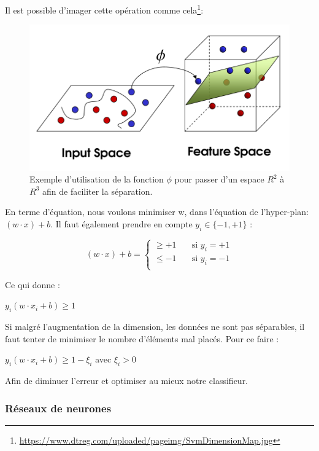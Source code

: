 \documentclass[a4paper, 11pt]{article}
\begin{document}
Il est possible d'imager cette opération comme cela\footnote{\url{https://www.dtreg.com/uploaded/pageimg/SvmDimensionMap.jpg}}:
\begin{figure}[H]
\centering
\includegraphics[scale=0.3]{images/svm_exemple_phi}
\caption{Exemple d'utilisation de la fonction $\phi$ pour passer d'un espace $R^2$ à $R^3$ afin de faciliter la séparation.}
\end{figure}


En terme d'équation, nous voulons minimiser w, dans l'équation de l'hyper-plan: $(w \cdot x) + b$. Il faut également prendre
en compte $y_i \in \{-1,+1\}$ :
\begin{center}
 \[ (w \cdot x) + b =
  \begin{cases}
    \ge +1   & \quad \text{si $y_i = +1$}\\
    \le -1 & \quad \text{si $y_i = -1$}\\
  \end{cases}
\]
\end{center}

 Ce qui donne \cite{svm_equation}:
\begin{center}
$y_i (w \cdot x_i + b) \ge 1$
\end{center}
Si malgré l'augmentation de la dimension, les données ne sont pas séparables, 
il faut tenter de minimiser le nombre d'éléments mal placés. Pour ce faire \cite{svm_equation}:
\begin{center}
$y_i (w \cdot x_i + b) \ge 1 - \xi_i$ avec $\xi_i > 0$ 
\end{center}
Afin de diminuer l'erreur et optimiser au mieux notre classifieur.


\subsubsection{Réseaux de neurones}
\end{document}
